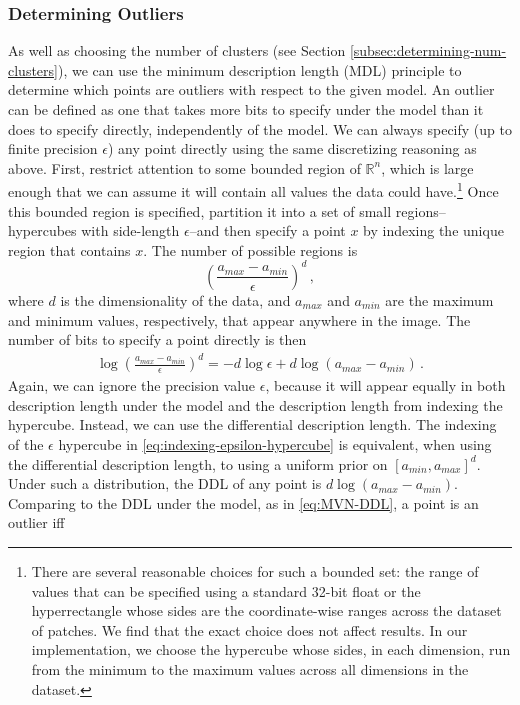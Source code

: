\documentclass[a4paper,fleqn]{cas-sc}
\theoremstyle{remark}
\begin{document}
\subsubsection{Determining Outliers}
As well as choosing the number of clusters (see Section \ref{subsec:determining-num-clusters}), 
we can use the minimum description length (MDL) principle to determine which points are outliers with respect to the given model. An outlier can be defined as one that takes more bits to specify under the model than it does to specify directly, independently of the model. We can always specify (up to finite precision $\epsilon$) any point directly using the same discretizing reasoning as above. First, restrict attention to some bounded region of $\mathbb{R}^n$, which is large enough that we can assume it will contain all values the data could have.\footnote{There are several reasonable choices for such a bounded set: the range of values that can be specified using a standard 32-bit float or the hyperrectangle whose sides are the coordinate-wise ranges across the dataset of patches. We find that the exact choice does not affect results. In our implementation, we choose the hypercube whose sides, in each dimension, run from the minimum to the maximum values across all dimensions in the dataset.} Once this bounded region is specified, partition it into a set of small regions--hypercubes with side-length $\epsilon$--and then specify a point $x$ by indexing the unique region that contains $x$. The number of possible regions is 
\[
\left(\frac{a_{max}-a_{min}}{\epsilon}\right)^d\,,
\]
where $d$ is the dimensionality of the data, and $a_{max}$ and $a_{min}$ are the maximum and minimum values, respectively, that appear anywhere in the image. The number of bits to specify a point directly is then 
\begin{align} \label{eq:indexing-epsilon-hypercube}
    \log \left(\frac{a_{max}-a_{min}}{\epsilon}\right)^d = -d \log \epsilon + d \log (a_{max}-a_{min})\,.
\end{align}
Again, we can ignore the precision value $\epsilon$, because it will appear equally in both description length under the model and the description length from indexing the hypercube. Instead, we can use the differential description length. The indexing of the $\epsilon$ hypercube in \eqref{eq:indexing-epsilon-hypercube} is equivalent, when using the differential description length, to using a uniform prior on $[a_{min},a_{max}]^d$. Under such a distribution, the DDL of any point is $d \log (a_{max}-a_{min})$.
Comparing to the DDL under the model, as in \eqref{eq:MVN-DDL}, a point is an outlier iff
\end{document}
